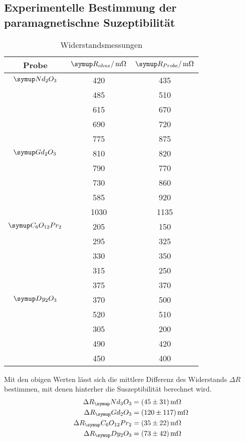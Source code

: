 \subsection{Experimentelle Bestimmung der paramagnetischne Suzeptibilität}
\begin{table}
  \centering
  \begin{tabular}{c c c}
    \toprule
    Probe & $\su{R_{ohne}/\mOhm}$ &$\su{R_{Probe}}/\mOhm$ \\
    \midrule
    $\su{Nd_2O_3}$   & 420 & 435 \\
                     & 485 & 510 \\
                     & 615 & 670 \\
                     & 690 & 720 \\
                     & 775 & 875 \\ \hline
    $\su{Gd_2O_3}$   & 810 & 820 \\
                     & 790 & 770 \\
                     & 730 & 860 \\
                     & 585 & 920 \\
                     &1030 &1135 \\ \hline
    $\su{C_6O_{12}Pr_2}$  & 205 & 150 \\
                          & 295 & 325 \\
                          & 330 & 350 \\
                          & 315 & 250 \\
                          & 375 & 370 \\ \hline
    $\su{Dy_2O_3}$   & 370 & 500 \\
                     & 520 & 510 \\
                     & 305 & 200 \\
                     & 490 & 420 \\
                     & 450 & 400 \\
    \bottomrule
  \end{tabular}
  \caption{Widerstandsmessungen}
  \label{tab:mess2}
\end{table}
Mit den obigen Werten lässt sich die mittlere Differenz des Widerstands
$\Delta R$ bestimmen, mit denen hinterher die Suszeptibilität berechnet wird.
\begin{align*}
  \Delta R_\su{Nd_3O_3}    &= ( 45 \pm  31) \mOhm \\
  \Delta R_\su{Gd_2O_3}    &= (120 \pm 117) \mOhm \\
  \Delta R_\su{C_6O_{12}Pr_2} &= ( 35 \pm  22) \mOhm \\
  \Delta R_\su{Dy_2O_3}    &= ( 73 \pm  42) \mOhm
\end{align*}
